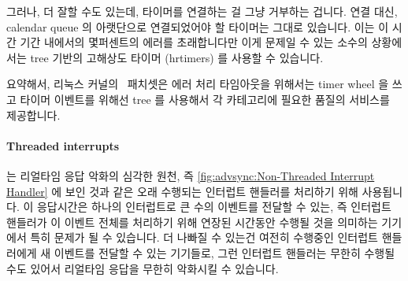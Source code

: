 \fi

그러나, 더 잘할 수도 있는데, 타이머를 연결하는 걸 그냥 거부하는 겁니다.
연결 대신, calendar queue 의 아랫단으로 연결되었어야 할 타이머는 그대로
있습니다.
이는 이 시간 기간 내에서의 몇퍼센트의 에러를 초래합니다만 이게 문제일 수 있는
소수의 상황에서는 tree 기반의 고해상도 타이머 (hrtimers) 를 사용할 수 있습니다.

요약해서, 리눅스 커널의 \rt\ 패치셋은 에러 처리 타임아웃을 위해서는 timer wheel
을 쓰고 타이머 이벤트를 위해선 tree 를 사용해서 각 카테고리에 필요한 품질의
서비스를 제공합니다.

\paragraph{Threaded interrupts}
는 리얼타임 응답 악화의 심각한 원천, 즉
\cref{fig:advsync:Non-Threaded Interrupt Handler} 에 보인 것과 같은 오래
수행되는 인터럽트 핸들러를 처리하기 위해 사용됩니다.
이 응답시간은 하나의 인터럽트로 큰 수의 이벤트를 전달할 수 있는, 즉 인터럽트
핸들러가 이 이벤트 전체를 처리하기 위해 연장된 시간동안 수행될 것을 의미하는
기기에서 특히 문제가 될 수 있습니다.
더 나빠질 수 있는건 여전히 수행중인 인터럽트 핸들러에게 새 이벤트를 전달할 수
있는 기기들로, 그런 인터럽트 핸들러는 무한히 수행될 수도 있어서 리얼타임 응답을
무한히 악화시킬 수 있습니다.


